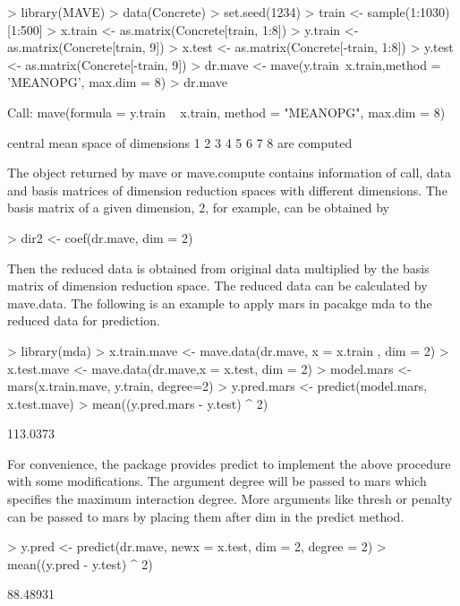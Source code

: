 \documentclass{article}
\newcommand{\pkg}[1]{{\fontseries{b}\selectfont #1}}
\newcommand{\code}[1]{\normalfont\ttfamily\hyphenchar\font=-1 #1}
\begin{document}
\begin{Schunk}
\begin{Sinput}
> library(MAVE)
> data(Concrete)
> set.seed(1234)
> train <- sample(1:1030)[1:500]
> x.train <- as.matrix(Concrete[train, 1:8])
> y.train <- as.matrix(Concrete[train, 9])
> x.test  <- as.matrix(Concrete[-train, 1:8])
> y.test  <- as.matrix(Concrete[-train, 9])
> dr.mave <- mave(y.train~x.train,method = 'MEANOPG', max.dim = 8)
> dr.mave
\end{Sinput}
\begin{Soutput}
Call:
mave(formula = y.train ~ x.train, method = "MEANOPG", max.dim = 8)

central mean space  of dimensions  1 2 3 4 5 6 7 8  are computed
\end{Soutput}
\end{Schunk}
The object returned by \code{mave} or \code{mave.compute} contains information of call, data and basis matrices of dimension reduction spaces with different dimensions. The basis matrix of a given dimension, 2, for example, can be obtained by
\begin{Schunk}
\begin{Sinput}
> dir2 <- coef(dr.mave, dim = 2)
\end{Sinput}
\end{Schunk}
Then the reduced data is obtained from original data multiplied by the basis matrix of dimension reduction space. The reduced data can be calculated by \code{mave.data}. The following is an example to apply \code{mars} in pacakge \pkg{mda} to the reduced data for prediction.
\begin{Schunk}
\begin{Sinput}
> library(mda)
> x.train.mave <- mave.data(dr.mave, x = x.train , dim = 2)
> x.test.mave <- mave.data(dr.mave,x = x.test, dim = 2)
> model.mars <- mars(x.train.mave, y.train, degree=2)
> y.pred.mars <- predict(model.mars, x.test.mave)
> mean((y.pred.mars - y.test) ^ 2)
\end{Sinput}
\begin{Soutput}
[1] 113.0373
\end{Soutput}
\end{Schunk}
For convenience, the package provides \code{predict} to implement the above procedure with some modifications. The argument \code{degree} will be passed to \code{mars} which specifies the maximum interaction degree. More arguments like \code{thresh} or \code{penalty} can be passed to \code{mars} by placing them after \code{dim} in the \code{predict} method.
\begin{Schunk}
\begin{Sinput}
> y.pred <- predict(dr.mave, newx = x.test, dim = 2, degree = 2)
> mean((y.pred - y.test) ^ 2)
\end{Sinput}
\begin{Soutput}
[1] 88.48931
\end{Soutput}
\end{Schunk}
\end{document}
